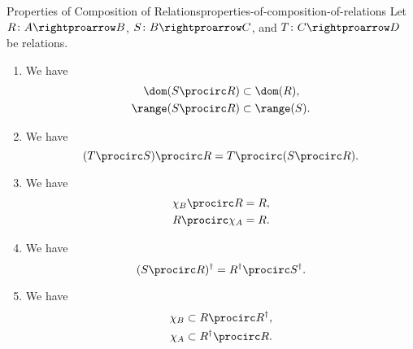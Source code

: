 \begin{proposition}{Properties of Composition of Relations}{properties-of-composition-of-relations}%
    Let $R\colon A\rightproarrow B$, $S\colon B\rightproarrow C$, and $T\colon C\rightproarrow D$ be relations.
    \begin{enumerate}
        \item\label{properties-of-composition-of-relations-interaction-with-ranges-and-domains}We have
            \begin{align*}
                \dom(S\procirc R)   &\subset \dom(R),\\
                \range(S\procirc R) &\subset \range(S).
            \end{align*}
        \item\label{properties-of-composition-of-relations-associativity}We have
            \[
                (T\procirc S)\procirc R
                =
                T\procirc(S\procirc R).
            \]%
        \item\label{properties-of-composition-of-relations-unitality}We have
            \begin{align*}
                \chi_{B}\procirc R &= R,\\
                R\procirc\chi_{A}  &= R.
            \end{align*}
        \item\label{properties-of-composition-of-relations-interaction-with-inverses}We have
            \[
                (S\procirc R)^{\dagger}
                =
                R^{\dagger}\procirc S^{\dagger}.
            \]%
        \item\label{properties-of-composition-of-relations-interaction-with-composition}We have
            \begin{align*}
                \chi_{B} &\subset R\procirc R^{\dagger},\\
                \chi_{A} &\subset R^{\dagger}\procirc R.
            \end{align*}
    \end{enumerate}
\end{proposition}
